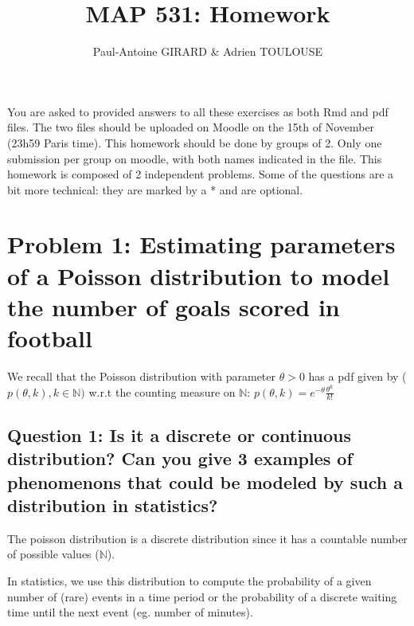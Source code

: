 \documentclass[]{article}
\title{MAP 531: Homework}
\author{Paul-Antoine GIRARD \& Adrien TOULOUSE}
\date{}
\begin{document}
\maketitle

You are asked to provided answers to all these exercises as both Rmd and
pdf files. The two files should be uploaded on Moodle on the 15th of
November (23h59 Paris time). This homework should be done by groups of
2. Only one submission per group on moodle, with both names indicated in
the file. This homework is composed of 2 independent problems. Some of
the questions are a bit more technical: they are marked by a * and are
optional.

\hypertarget{problem-1-estimating-parameters-of-a-poisson-distribution-to-model-the-number-of-goals-scored-in-football}{%
\section{Problem 1: Estimating parameters of a Poisson distribution to
model the number of goals scored in
football}\label{problem-1-estimating-parameters-of-a-poisson-distribution-to-model-the-number-of-goals-scored-in-football}}

We recall that the Poisson distribution with parameter \(\theta > 0\)
has a pdf given by (\(p(\theta, k), k \in \mathbb{N})\) w.r.t the
counting measure on \(\mathbb{N}\):
\(p(\theta, k) = e^{-\theta} \frac{\theta^k}{k!}\)

\hypertarget{question-1-is-it-a-discrete-or-continuous-distribution-can-you-give-3-examples-of-phenomenons-that-could-be-modeled-by-such-a-distribution-in-statistics}{%
\subsection{Question 1: Is it a discrete or continuous distribution? Can
you give 3 examples of phenomenons that could be modeled by such a
distribution in
statistics?}\label{question-1-is-it-a-discrete-or-continuous-distribution-can-you-give-3-examples-of-phenomenons-that-could-be-modeled-by-such-a-distribution-in-statistics}}

The poisson distribution is a discrete distribution since it has a
countable number of possible values (\(\mathbb{N}\)).

In statistics, we use this distribution to compute the probability of a
given number of (rare) events in a time period or the probability of a
discrete waiting time until the next event (eg. number of minutes).
\end{document}
